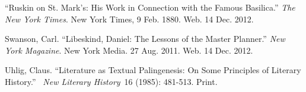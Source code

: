 {\color{black}
“Ruskin on St. Mark’s: His Work in Connection with the Famous Basilica.”
 \textit{The New York Times}.  New York Times, 9 Feb. 1880.  Web.  14
Dec. 2012.}

{\color{black}
Swanson, Carl.  “Libeskind, Daniel: The Lessons of the Master Planner.” 
\textit{New York Magazine}.  New York Media. 27 Aug. 2011.  Web.  14
Dec. 2012.  }

{\color{black}
Uhlig, Claus.  “Literature as Textual Palingenesis: On Some Principles
of Literary History.”~  \textit{New Literary History}~16 (1985):
481-513.  Print.  }


\bigskip


\bigskip


\bigskip


\bigskip


\bigskip

